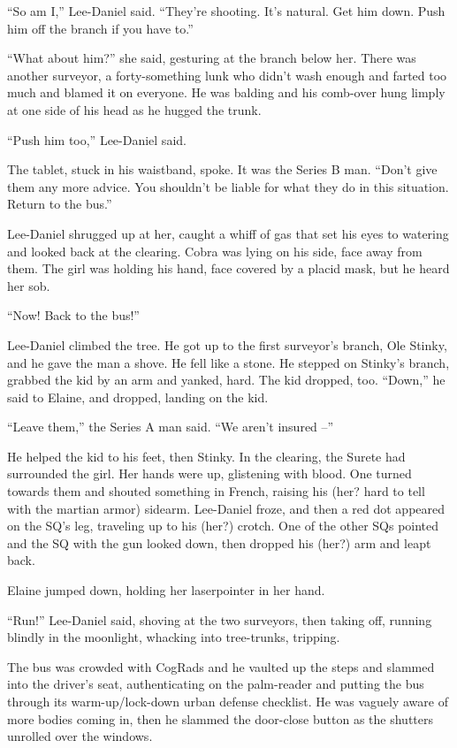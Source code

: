 “So am I,” Lee-Daniel said. “They're shooting. It's natural. Get 
him down. Push him off the branch if you have to.”

“What about him?” she said, gesturing at the branch below her. 
There was another surveyor, a forty-something lunk who didn't wash 
enough and farted too much and blamed it on everyone. He was balding 
and his comb-over hung limply at one side of his head as he hugged the 
trunk.

“Push him too,” Lee-Daniel said.

The tablet, stuck in his waistband, spoke. It was the Series B man. 
“Don't give them any more advice. You shouldn't be liable for what 
they do in this situation. Return to the bus.”

Lee-Daniel shrugged up at her, caught a whiff of gas that set his eyes 
to watering and looked back at the clearing. Cobra was lying on his 
side, face away from them. The girl was holding his hand, face covered 
by a placid mask, but he heard her sob.

“Now! Back to the bus!”

Lee-Daniel climbed the tree. He got up to the first surveyor's branch, 
Ole Stinky, and he gave the man a shove. He fell like a stone. He 
stepped on Stinky's branch, grabbed the kid by an arm and yanked, hard. 
The kid dropped, too. “Down,” he said to Elaine, and dropped, 
landing on the kid.

“Leave them,” the Series A man said. “We aren't insured --”

He helped the kid to his feet, then Stinky. In the clearing, the Surete 
had surrounded the girl. Her hands were up, glistening with blood. One 
turned towards them and shouted something in French, raising his (her? 
hard to tell with the martian armor) sidearm. Lee-Daniel froze, and 
then a red dot appeared on the SQ's leg, traveling up to his (her?) 
crotch. One of the other SQs pointed and the SQ with the gun looked 
down, then dropped his (her?) arm and leapt back.

Elaine jumped down, holding her laserpointer in her hand.

“Run!” Lee-Daniel said, shoving at the two surveyors, then taking 
off, running blindly in the moonlight, whacking into tree-trunks, 
tripping.

The bus was crowded with CogRads and he vaulted up the steps and 
slammed into the driver's seat, authenticating on the palm-reader and 
putting the bus through its warm-up/lock-down urban defense checklist. 
He was vaguely aware of more bodies coming in, then he slammed the 
door-close button as the shutters unrolled over the windows.

